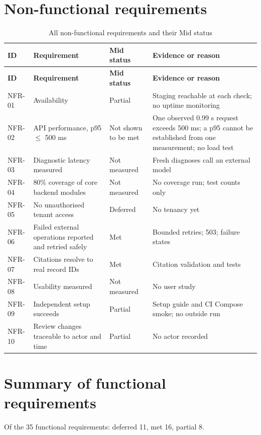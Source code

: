 \section*{Non-functional requirements}
\begin{longtable}{p{}p{}p{}p{}}
\caption{All non-functional requirements and their Mid status}\label{tab:allnfr}\\
\toprule \textbf{ID} & \textbf{Requirement} & \textbf{Mid status} & \textbf{Evidence or reason} \\ \midrule \endfirsthead
\toprule \textbf{ID} & \textbf{Requirement} & \textbf{Mid status} & \textbf{Evidence or reason} \\ \midrule \endhead
NFR-01 & Availability & Partial & Staging reachable at each check; no uptime monitoring \\
NFR-02 & API performance, p95 $\le$ 500 ms & Not shown to be met & One observed 0.99 s request exceeds 500 ms; a p95 cannot be established from one measurement; no load test \\
NFR-03 & Diagnostic latency measured & Not measured & Fresh diagnoses call an external model \\
NFR-04 & 80\% coverage of core backend modules & Not measured & No coverage run; test counts only \\
NFR-05 & No unauthorised tenant access & Deferred & No tenancy yet \\
NFR-06 & Failed external operations reported and retried safely & Met & Bounded retries; 503; failure states \\
NFR-07 & Citations resolve to real record IDs & Met & Citation validation and tests \\
NFR-08 & Usability measured & Not measured & No user study \\
NFR-09 & Independent setup succeeds & Partial & Setup guide and CI Compose smoke; no outside run \\
NFR-10 & Review changes traceable to actor and time & Partial & No actor recorded \\
\bottomrule
\end{longtable}

\section*{Summary of functional requirements}
Of the 35 functional requirements: deferred 11, met 16, partial 8.
